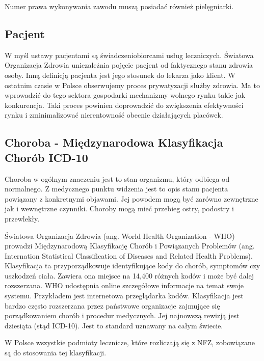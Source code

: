 Numer prawa wykonywania zawodu muszą posiadać również pielęgniarki.

\subsection{Pacjent}
W myśl ustawy pacjentami są świadczeniobiorcami usług leczniczych. Światowa Organizacja Zdrowia uniezależnia pojęcie pacjent od faktycznego stanu zdrowia osoby. Inną definicją pacjenta jest jego stosunek do lekarza jako klient. W ostatnim czasie w Polsce obserwujemy proces prywatyzacji służby zdrowia. Ma to wprowadzić do tego sektora gospodarki mechanizmy wolnego rynku takie jak konkurencja. Taki proces powinien doprowadzić do zwiększenia efektywności rynku i zminimalizować nierentowność obecnie działających placówek.  

\subsection{Choroba - Międzynarodowa Klasyfikacja Chorób ICD-10}
\label{subsec:choroba}
Choroba w ogólnym znaczeniu jest to stan organizmu, który odbiega od normalnego. Z medycznego punktu widzenia jest to opis stanu pacjenta powiązany z konkretnymi objawami. Jej powodem mogą być zarówno zewnętrzne jak i wewnętrzne czynniki. Choroby mogą mieć przebieg ostry, podostry i przewlekły.

Światowa Organizacja Zdrowia (ang. World Health Organization - WHO) prowadzi Międzynarodową Klasyfikację Chorób i Powiązanych Problemów (ang. Internation Statistical Classification of Diseases and Related Health Problems). Klasyfikacja ta przyporządkowuje identyfikujące kody do chorób, symptomów czy uszkodzeń ciała. Zawiera ona miejsce na 14,400 różnych kodów i może być dalej rozszerzana. WHO udostępnia online szczegółowe informacje na temat swoje systemu. Przykładem jest internetowa przeglądarka kodów. Klasyfikacja jest bardzo często rozszerzana przez państwowe organizacje zajmujące się porządkowaniem chorób i procedur medycznych. Jej najnowszą rewizją jest dziesiąta (stąd ICD-10). Jest to standard uznawany na całym świecie.

W Polsce wszystkie podmioty lecznicze, które rozliczają się z NFZ, zobowiązane są do stosowania tej klasyfikacji. 

